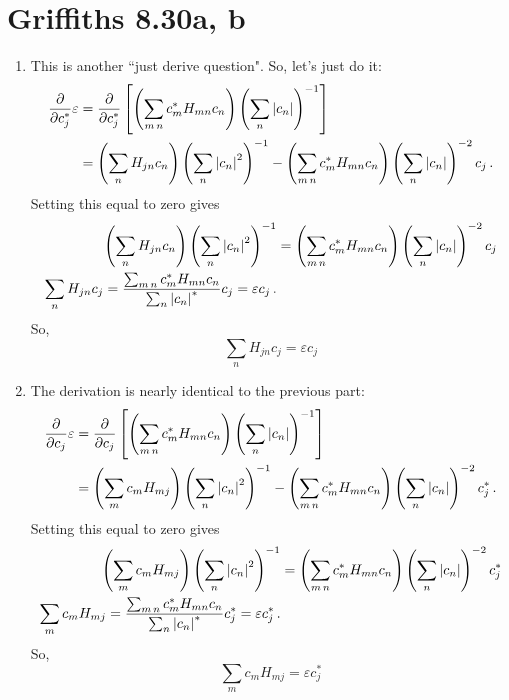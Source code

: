 \documentclass[11pt]{article}
\begin{document}
\section*{Griffiths 8.30a, b}
\begin{enumerate}[label=\alph*)]
\item This is another ``just derive question". So, let's just do it:
\begin{align*}
\pdv{c_j^*} \varepsilon & = \pdv{c_j^*}\left[\left(\sum_{m \, n} c^*_m H_{mn} c_n\right)\left(\sum_n \abs{c_n}\right)^{-1}\right]\\
& = \left(\sum_{n}H_{jn} c_n\right)\left(\sum_{n}\abs{c_n}^2\right)^{-1} - \left(\sum_{m \, n} c^*_m H_{mn} c_n\right)\left(\sum_n \abs{c_n}\right)^{-2}c_j \, . 
\end{align*}
Setting this equal to zero gives
\begin{align*}
\left(\sum_{n}H_{jn} c_n\right)\left(\sum_{n}\abs{c_n}^2\right)^{-1} & = \left(\sum_{m \, n} c^*_m H_{mn} c_n\right)\left(\sum_n \abs{c_n}\right)^{-2}c_j\\
\sum_{n}H_{jn} c_j = \frac{\sum_{m \, n}c_m^* H_{mn}c_n}{\sum_{n}\abs{c_n}^*} c_j = \varepsilon c_j \, .
\end{align*}
So,
\begin{equation}
\boxed{\sum_{n}H_{jn} c_j = \varepsilon c_j}
\label{eq:1}
\end{equation}
\item
The derivation is nearly identical to the previous part:
\begin{align*}
\pdv{c_j} \varepsilon & = \pdv{c_j}\left[\left(\sum_{m \, n} c^*_m H_{mn} c_n\right)\left(\sum_n \abs{c_n}\right)^{-1}\right]\\
& = \left(\sum_{m}c_m H_{mj}\right)\left(\sum_{n}\abs{c_n}^2\right)^{-1} - \left(\sum_{m \, n} c^*_m H_{mn} c_n\right)\left(\sum_n \abs{c_n}\right)^{-2}c_j^* \, . 
\end{align*}
Setting this equal to zero gives
\begin{align*}
\left(\sum_{m}c_m H_{mj}\right)\left(\sum_{n}\abs{c_n}^2\right)^{-1} & = \left(\sum_{m \, n} c^*_m H_{mn} c_n\right)\left(\sum_n \abs{c_n}\right)^{-2}c_j^*\\
\sum_{m}c_m H_{mj}= \frac{\sum_{m \, n}c_m^* H_{mn}c_n}{\sum_{n}\abs{c_n}^*} c_j^* = \varepsilon c_j^* \, .
\end{align*}
So,
\begin{equation}
\boxed{\sum_{m}c_m H_{mj} = \varepsilon c_j^*}
\label{eq:2}
\end{equation}


\end{enumerate}
\end{document}
